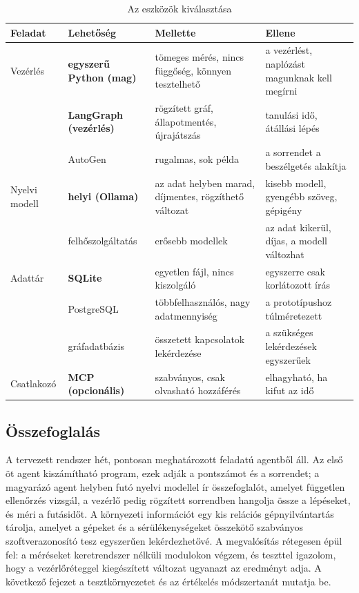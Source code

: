 \begin{table}[H]
    \centering
    \caption{Az eszközök kiválasztása}
    \label{tab:eszkozok}
    \small
    \begin{tabular}{|L{2.2cm}|L{3.0cm}|L{3.9cm}|L{4.0cm}|}
        \hline
        \textbf{Feladat} & \textbf{Lehetőség} & \textbf{Mellette} & \textbf{Ellene} \\ \hline
        Vezérlés & \textbf{egyszerű Python (mag)} & tömeges mérés, nincs függőség, könnyen tesztelhető & a vezérlést, naplózást magunknak kell megírni \\ 
         & \textbf{LangGraph (vezérlés)} & rögzített gráf, állapotmentés, újrajátszás & tanulási idő, átállási lépés \\ 
         & AutoGen & rugalmas, sok példa & a sorrendet a beszélgetés alakítja \\ \hline
        Nyelvi modell & \textbf{helyi (Ollama)} & az adat helyben marad, díjmentes, rögzíthető változat & kisebb modell, gyengébb szöveg, gépigény \\ 
         & felhőszolgáltatás & erősebb modellek & az adat kikerül, díjas, a modell változhat \\ \hline
        Adattár & \textbf{SQLite} & egyetlen fájl, nincs kiszolgáló & egyszerre csak korlátozott írás \\ 
         & PostgreSQL & többfelhasználós, nagy adatmennyiség & a prototípushoz túlméretezett \\ 
         & gráfadatbázis & összetett kapcsolatok lekérdezése & a szükséges lekérdezések egyszerűek \\ \hline
        Csatlakozó & \textbf{\acs{MCP} (opcionális)} & szabványos, csak olvasható hozzáférés & elhagyható, ha kifut az idő \\ \hline
    \end{tabular}
\end{table}

\subsection{Összefoglalás}
A tervezett rendszer hét, pontosan meghatározott feladatú agentből áll. Az első öt agent kiszámítható program, ezek adják a pontszámot és a sorrendet; a magyarázó agent helyben futó nyelvi modellel ír összefoglalót, amelyet független ellenőrzés vizsgál, a vezérlő pedig rögzített sorrendben hangolja össze a lépéseket, és méri a futásidőt. A környezeti információt egy kis relációs gépnyilvántartás tárolja, amelyet a gépeket és a sérülékenységeket összekötő szabványos szoftverazonosító tesz egyszerűen lekérdezhetővé. A megvalósítás rétegesen épül fel: a méréseket keretrendszer nélküli modulokon végzem, és teszttel igazolom, hogy a vezérlőréteggel kiegészített változat ugyanazt az eredményt adja. A következő fejezet a tesztkörnyezetet és az értékelés módszertanát mutatja be.